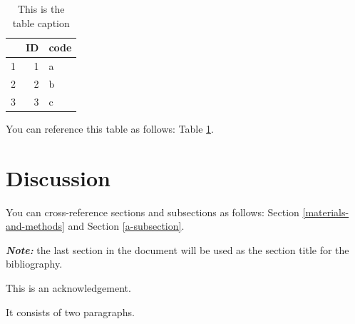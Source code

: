 \documentclass[12pt,halfline,a4paper,]{ouparticle}
\begin{document}
\begin{table}[ht]
\centering
\begin{tabular}{rrl}
  \hline
 & ID & code \\ 
  \hline
1 &   1 & a \\ 
  2 &   2 & b \\ 
  3 &   3 & c \\ 
   \hline
\end{tabular}
\caption{This is the table caption} 
\label{tab:tab1}
\end{table}

You can reference this table as follows: Table \ref{tab:tab1}.

\hypertarget{discussion-1}{%
\section{Discussion}\label{discussion-1}}

You can cross-reference sections and subsections as follows: Section
\ref{materials-and-methods} and Section \ref{a-subsection}.

\textbf{\emph{Note:}} the last section in the document will be used as
the section title for the bibliography.


\begin{notes}[Acknowledgements]
This is an acknowledgement.

It consists of two paragraphs.
\end{notes}


\renewcommand\refname{References}


\end{document}
